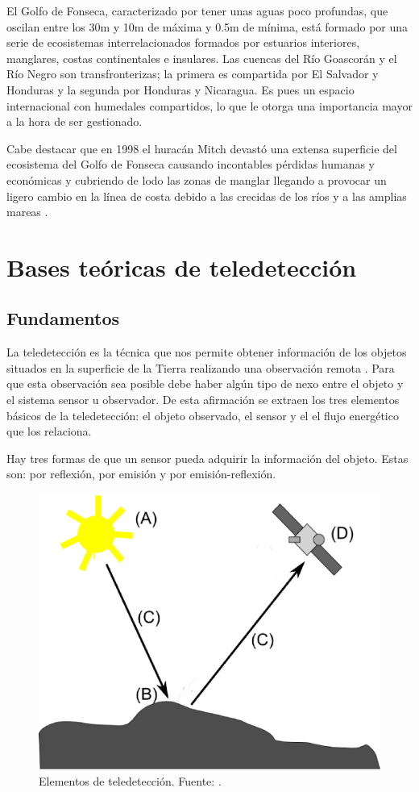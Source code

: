 El Golfo de Fonseca, caracterizado por tener unas aguas poco profundas, que oscilan entre los 30m y 10m de máxima y 0.5m de mínima, está formado por una serie de ecosistemas interrelacionados formados por estuarios interiores, manglares, costas continentales e insulares. Las cuencas del Río Goascorán y el Río Negro son transfronterizas; la primera es compartida por El Salvador y Honduras y la segunda por Honduras y Nicaragua. Es pues un espacio internacional con humedales compartidos, lo que le otorga una importancia mayor a la hora de ser gestionado.\Sep

Cabe destacar que en 1998 el huracán Mitch devastó una extensa superficie del ecosistema del Golfo de Fonseca causando incontables pérdidas humanas y económicas y cubriendo de lodo las zonas de manglar llegando a provocar un ligero cambio en la línea de costa debido a las crecidas de los ríos y a las amplias mareas \citep{mexico1999honduras}.

\section{Bases teóricas de teledetección}
\label{sec:bases}

\subsection{Fundamentos} \label{subsec:fundamentos}
La teledetección es la técnica que nos permite obtener información de los objetos situados en la superficie de la Tierra realizando una observación remota \citep{Curran1991Longman} \citep{chuvieco2002teledeteccion} \citep{schowengerdt2006}. Para que esta observación sea posible debe haber algún tipo de nexo entre el objeto y el sistema sensor u observador. De esta afirmación se extraen los tres elementos básicos de la teledetección: el objeto observado, el sensor y el el flujo energético que los relaciona.\Sep

Hay tres formas de que un sensor pueda adquirir la información del objeto. Estas son: por reflexión, por emisión y por emisión-reflexión.\Sep

\begin{figure}
	\centering
	\includegraphics[width=0.4\linewidth]{./Imagenes/Elementos_teledeteccion_modificado.eps}
	\caption[Elementos de teledetección]{Elementos de teledetección. Fuente: \cite{Olaya2010}.}
	\label{fig:elementos}
\end{figure}

